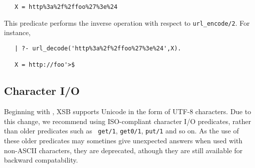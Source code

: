 \begin{description}
\begin{verbatim}
   X = http%3a%2f%2ffoo%27%3e%24
\end{verbatim}

   This predicate performs the inverse operation with respect to 
   \texttt{url\_encode/2}. For instance, 
\begin{verbatim}
   | ?- url_decode('http%3a%2f%2ffoo%27%3e%24',X).

   X = http://foo'>$
\end{verbatim}

\end{description}

\subsection{Character I/O}
Beginning with \version{}, XSB supports Unicode in the form of UTF-8
characters.  Due to this change, we recommend using ISO-compliant
character I/O predicates, rather than older predicates such as {\tt
  get/1}, {\tt get0/1}, {\tt put/1} and so on.  As the use of these
older predicates may sometines give unexpected answers when used with
non-ASCII characters, they are deprecated, athough they are still
available for backward compatability.


